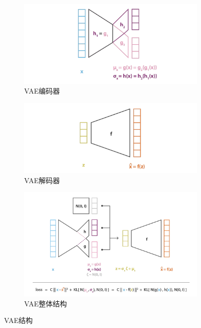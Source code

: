 \documentclass[]{report}
\begin{document}
\begin{figure}[ht]
	\centering
	\begin{subfigure}[b]{0.4\textwidth}
		\includegraphics[width=\textwidth]{images/screenshot009}
		\caption{VAE编码器}
		\label{fig:screenshot009}
	\end{subfigure}
	\hfill %
	\begin{subfigure}[b]{0.4\textwidth}
		\includegraphics[width=\textwidth]{images/screenshot010}
		\caption{VAE解码器}
		\label{fig:sub2}
	\end{subfigure}
	\begin{subfigure}[b]{0.8\textwidth}
		\includegraphics[width=\textwidth]{images/screenshot011}
		\caption{VAE整体结构}
		\label{fig:sub3}
		\end{subfigure}
	\caption{VAE结构}
	\label{fig:test}
\end{figure}
\end{document}
